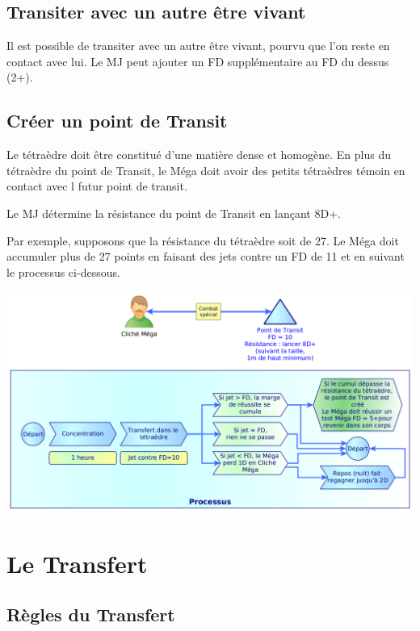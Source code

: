 \documentclass[11pt]{article}
\begin{document}
\subsection{Transiter avec un autre être vivant}

Il est possible de transiter avec un autre être vivant, pourvu que l'on reste en contact avec lui. Le MJ peut ajouter un FD supplémentaire au FD du dessus (2+).

\subsection{Créer un point de Transit}

Le tétraèdre doit être constitué d'une matière dense et homogène. En plus du tétraèdre du point de Transit, le Méga doit avoir des petits tétraèdres témoin en contact avec l futur point de transit. 

Le MJ détermine la résistance du point de Transit en lançant 8D+.

Par exemple, supposons que la résistance du tétraèdre soit de 27. Le Méga doit accumuler plus de 27 points en faisant des jets contre un FD de 11 et en suivant le processus ci-dessous.


\begin{center}
\includegraphics[scale=0.28]{05-point-transit}
\end{center}



\newpage
\section{Le Transfert}

\subsection{Règles du Transfert}
\end{document}
